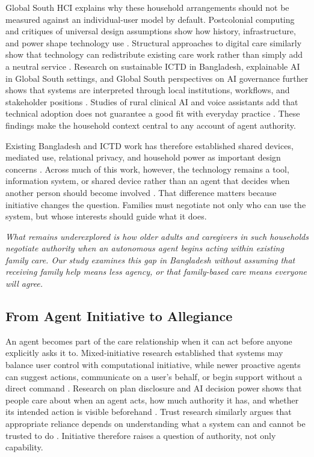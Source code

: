 Global South HCI explains why these household arrangements should not be measured against an individual-user model by default. Postcolonial computing and critiques of universal design assumptions show how history, infrastructure, and power shape technology use \cite{26,49}. Structural approaches to digital care similarly show that technology can redistribute existing care work rather than simply add a neutral service \cite{53}. Research on sustainable ICTD in Bangladesh, explainable AI in Global South settings, and Global South perspectives on AI governance further shows that systems are interpreted through local institutions, workflows, and stakeholder positions \cite{84,88,96}. Studies of rural clinical AI and voice assistants add that technical adoption does not guarantee a good fit with everyday practice \cite{89,114}. These findings make the household context central to any account of agent authority.

Existing Bangladesh and ICTD work has therefore established shared devices, mediated use, relational privacy, and household power as important design concerns \cite{1,2,3,4,33,98,110}. Across much of this work, however, the technology remains a tool, information system, or shared device rather than an agent that decides when another person should become involved \cite{26,49,53,84,88,96,114}. That difference matters because initiative changes the question. Families must negotiate not only who can use the system, but whose interests should guide what it does.

\textit{What remains underexplored is how older adults and caregivers in such households negotiate authority when an autonomous agent begins acting within existing family care. Our study examines this gap in Bangladesh without assuming that receiving family help means less agency, or that family-based care means everyone will agree.}

\subsection{From Agent Initiative to Allegiance}

An agent becomes part of the care relationship when it can act before anyone explicitly asks it to. Mixed-initiative research established that systems may balance user control with computational initiative, while newer proactive agents can suggest actions, communicate on a user's behalf, or begin support without a direct command \cite{45,52,70}. Research on plan disclosure and AI decision power shows that people care about when an agent acts, how much authority it has, and whether its intended action is visible beforehand \cite{42,55}. Trust research similarly argues that appropriate reliance depends on understanding what a system can and cannot be trusted to do \cite{57,67}. Initiative therefore raises a question of authority, not only capability.

